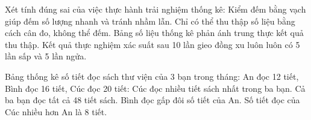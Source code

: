 \begin{ex} %
Xét tính đúng sai của việc thực hành trải nghiệm thống kê:
\choiceTF
{\True Kiểm đếm bằng vạch giúp đếm số lượng nhanh và tránh nhầm lẫn.}
{Chỉ có thể thu thập số liệu bằng cách cân đo, không thể đếm.}
{\True Bảng số liệu thống kê phản ánh trung thực kết quả thu thập.}
{Kết quả thực nghiệm xác suất sau 10 lần gieo đồng xu luôn luôn có 5 lần sấp và 5 lần ngửa.}
\end{ex}

\begin{ex} %
Bảng thống kê số tiết đọc sách thư viện của 3 bạn trong tháng: An đọc 12 tiết, Bình đọc 16 tiết, Cúc đọc 20 tiết:
\choiceTF
{\True Cúc đọc nhiều tiết sách nhất trong ba bạn.}
{\True Cả ba bạn đọc tất cả 48 tiết sách.}
{Bình đọc gấp đôi số tiết của An.}
{\True Số tiết đọc của Cúc nhiều hơn An là 8 tiết.}
\end{ex}

